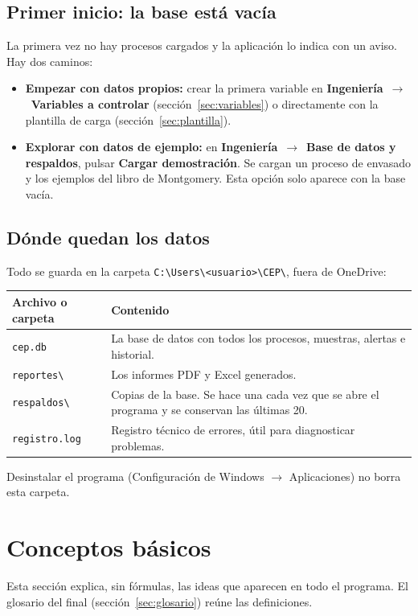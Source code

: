 \documentclass[11pt,a4paper]{article}
\newcommand{\boton}[1]{\textbf{#1}}                      %
\newcommand{\ruta}[2]{\textbf{#1}~$\rightarrow$~\textbf{#2}} %
\newcommand{\bs}{\textbackslash{}}
\begin{document}
\subsection{Primer inicio: la base está vacía}
La primera vez no hay procesos cargados y la aplicación lo indica con un aviso. Hay dos caminos:
\begin{itemize}
\item \textbf{Empezar con datos propios:} crear la primera variable en
  \ruta{Ingeniería}{Variables a controlar} (sección~\ref{sec:variables}) o directamente con la
  plantilla de carga (sección~\ref{sec:plantilla}).
\item \textbf{Explorar con datos de ejemplo:} en \ruta{Ingeniería}{Base de datos y respaldos},
  pulsar \boton{Cargar demostración}. Se cargan un proceso de envasado y los ejemplos del libro de
  Montgomery. Esta opción solo aparece con la base vacía.
\end{itemize}

\subsection{Dónde quedan los datos}
Todo se guarda en la carpeta \texttt{C:\bs Users\bs <usuario>\bs CEP\bs}, fuera de OneDrive:

\begin{tabularx}{\linewidth}{@{}P{3.4cm}L@{}}
\toprule
\textbf{Archivo o carpeta} & \textbf{Contenido}\\
\midrule
\texttt{cep.db} & La base de datos con todos los procesos, muestras, alertas e historial.\\
\texttt{reportes\bs} & Los informes PDF y Excel generados.\\
\texttt{respaldos\bs} & Copias de la base. Se hace una cada vez que se abre el programa y se conservan las últimas 20.\\
\texttt{registro.log} & Registro técnico de errores, útil para diagnosticar problemas.\\
\bottomrule
\end{tabularx}

Desinstalar el programa (Configuración de Windows $\rightarrow$ Aplicaciones) no borra esta carpeta.

\section{Conceptos básicos}
Esta sección explica, sin fórmulas, las ideas que aparecen en todo el programa. El glosario del
final (sección~\ref{sec:glosario}) reúne las definiciones.
\end{document}
